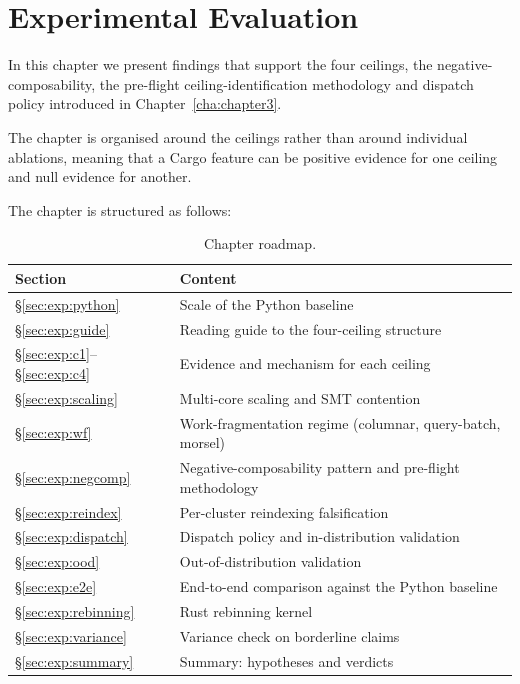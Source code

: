 \chapter{Experimental Evaluation\label{cha:chapter4}}

In this chapter we present findings that support the four ceilings, the negative-composability, the pre-flight ceiling-identification methodology and dispatch policy introduced in Chapter~\ref{cha:chapter3}.

The chapter is organised around the ceilings rather than around individual ablations, meaning that a Cargo feature can be positive evidence for one ceiling and null evidence for another.

The chapter is structured as follows:

\begin{table}[H]
  \centering
  \caption{Chapter roadmap.}
  \label{tab:exp:roadmap}
  \begin{tabular}{ll}
    \toprule
    Section & Content \\
    \midrule
    §\ref{sec:exp:python} & Scale of the Python baseline \\
    §\ref{sec:exp:guide} & Reading guide to the four-ceiling structure \\
    §\ref{sec:exp:c1}--§\ref{sec:exp:c4} & Evidence and mechanism for each ceiling \\
    §\ref{sec:exp:scaling} & Multi-core scaling and SMT contention \\
    §\ref{sec:exp:wf} & Work-fragmentation regime (columnar, query-batch, morsel) \\
    §\ref{sec:exp:negcomp} & Negative-composability pattern and pre-flight methodology \\
    §\ref{sec:exp:reindex} & Per-cluster reindexing falsification \\
    §\ref{sec:exp:dispatch} & Dispatch policy and in-distribution validation \\
    §\ref{sec:exp:ood} & Out-of-distribution validation \\
    §\ref{sec:exp:e2e} & End-to-end comparison against the Python baseline \\
    §\ref{sec:exp:rebinning} & Rust rebinning kernel \\
    §\ref{sec:exp:variance} & Variance check on borderline claims \\
    §\ref{sec:exp:summary} & Summary: hypotheses and verdicts \\
    \bottomrule
  \end{tabular}
\end{table}

